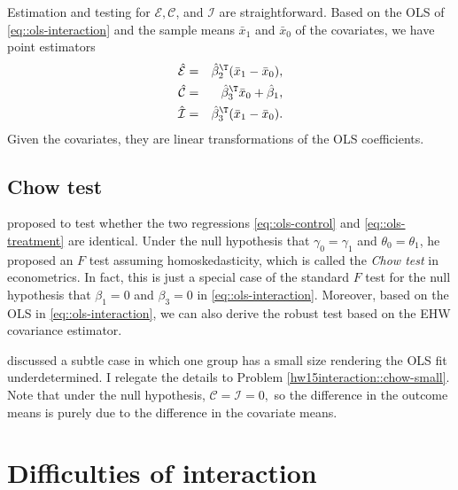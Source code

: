 Estimation and testing for $\mathcal E, \mathcal C$, and $\mathcal I$ are straightforward. Based on the OLS of \eqref{eq::ols-interaction} and the sample means $\bar{x}_1$ and $\bar{x}_0$ of the covariates, we have point estimators
\begin{eqnarray*}
\hat{\mathcal E} &=& \hat \beta_2^{\T} (\bar{x}_1 - \bar{x}_0),\\ 
\hat{\mathcal C} &=& \hat \beta_3^{\T}  \bar{x}_0 +  \hat \beta_1,\\ 
\hat{\mathcal I} &=& \hat \beta_3^{\T} (\bar{x}_1 - \bar{x}_0).
\end{eqnarray*}
Given the covariates, they are linear transformations of the OLS coefficients. 





\subsection{Chow test}


\citet{chow1960tests} proposed to test whether the two regressions \eqref{eq::ols-control} and \eqref{eq::ols-treatment} are identical. Under the null hypothesis that $\gamma_0 = \gamma_1$ and $\theta_0 = \theta_1$, he proposed an $F$ test assuming homoskedasticity, which is called the {\it Chow test} in econometrics. In fact, this is just a special case of the standard $F$ test for the null hypothesis that $\beta_1=0$ and $\beta_3 = 0$ in \eqref{eq::ols-interaction}. Moreover, based on the OLS in \eqref{eq::ols-interaction}, we can also derive the robust test based on the EHW covariance estimator. 


\citet{chow1960tests} discussed a subtle case in which one group has a small size rendering the OLS fit underdetermined. I relegate the details to Problem \ref{hw15interaction::chow-small}. Note that under the null hypothesis, $\mathcal C = \mathcal I  = 0,$ so the difference in the outcome means is purely due to the difference in the covariate means. 







 



 
 





\section{Difficulties of interaction}



